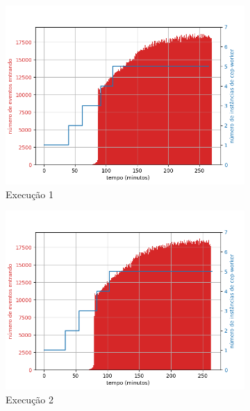 \begin{figure}[h!]
\begin{subfigure}{.5\textwidth}
  \centering
  \includegraphics[width=\linewidth]{figuras/graphics/carga_e_workers_total5-dez-su.png}  
  \caption{Execução 1}
  \label{fig:cewt-5-dez-su}
\end{subfigure}
\begin{subfigure}{.5\textwidth}
  \centering
  \includegraphics[width=\linewidth]{figuras/graphics/carga_e_workers_total7-dez-su.png}  
  \caption{Execução 2}
  \label{fig:cewt-7-dez-su}
\end{subfigure}
\begin{subfigure}{.5\textwidth}

\end{subfigure}
\end{figure}
